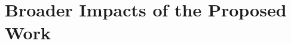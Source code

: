 \documentclass[preprint,11pt]{aastex}
\begin{document}
%
%


\vspace{-10pt}
\section{Broader Impacts of the Proposed Work}
\vspace{-5pt}
\label{BIsec}
\end{document}
